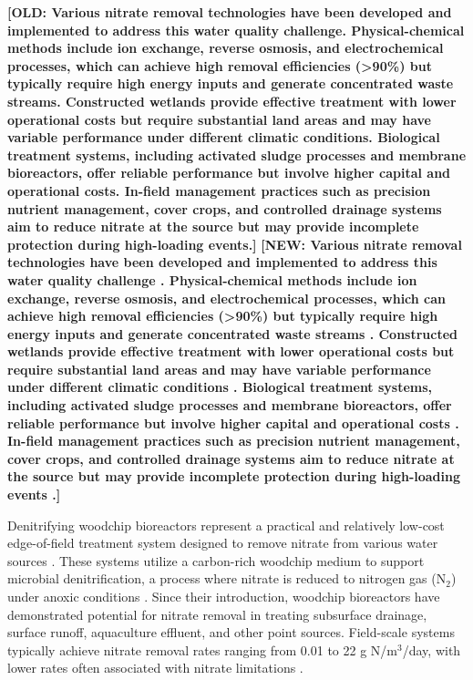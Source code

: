 \documentclass[12pt,a4paper]{article}
\newcommand{\changed}[2]{\textcolor{deletedtext}{\textbf{[OLD: #1]}} \textcolor{changedtext}{\textbf{[NEW: #2]}}}
\begin{document}
\changed{Various nitrate removal technologies have been developed and implemented to address this water quality challenge. Physical-chemical methods include ion exchange, reverse osmosis, and electrochemical processes, which can achieve high removal efficiencies (>90\%) but typically require high energy inputs and generate concentrated waste streams. Constructed wetlands provide effective treatment with lower operational costs but require substantial land areas and may have variable performance under different climatic conditions. Biological treatment systems, including activated sludge processes and membrane bioreactors, offer reliable performance but involve higher capital and operational costs. In-field management practices such as precision nutrient management, cover crops, and controlled drainage systems aim to reduce nitrate at the source but may provide incomplete protection during high-loading events.}{Various nitrate removal technologies have been developed and implemented to address this water quality challenge \citep{RN625, RN826}. Physical-chemical methods include ion exchange, reverse osmosis, and electrochemical processes, which can achieve high removal efficiencies (>90\%) but typically require high energy inputs and generate concentrated waste streams \citep{RN625}. Constructed wetlands provide effective treatment with lower operational costs but require substantial land areas and may have variable performance under different climatic conditions \citep{RN826}. Biological treatment systems, including activated sludge processes and membrane bioreactors, offer reliable performance but involve higher capital and operational costs \citep{RN625}. In-field management practices such as precision nutrient management, cover crops, and controlled drainage systems aim to reduce nitrate at the source but may provide incomplete protection during high-loading events \citep{RN826}.}

Denitrifying woodchip bioreactors represent a practical and relatively low-cost edge-of-field treatment system designed to remove nitrate from various water sources \citep{RN625, RN310}. These systems utilize a carbon-rich woodchip medium to support microbial denitrification, a process where nitrate is reduced to nitrogen gas (N$_{2}$) under anoxic conditions \citep{RN242, RN629}. Since their introduction, woodchip bioreactors have demonstrated potential for nitrate removal in treating subsurface drainage, surface runoff, aquaculture effluent, and other point sources. Field-scale systems typically achieve nitrate removal rates ranging from 0.01 to 22 g N/m$^3$/day, with lower rates often associated with nitrate limitations \citep{RN625, RN310}.
\end{document}
